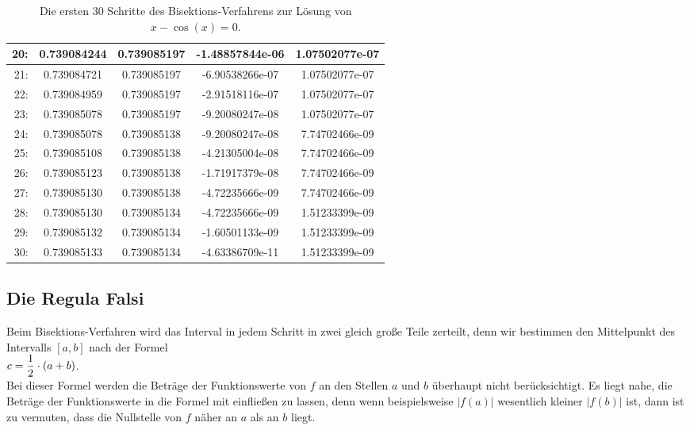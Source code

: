 \begin{table}[!h]
{\begin{tabular}{|r|c|c|c|c|}
\hline
 20: & 0.739084244 & 0.739085197 & -1.48857844e-06 & 1.07502077e-07 \\
\hline
 21: & 0.739084721 & 0.739085197 & -6.90538266e-07 & 1.07502077e-07 \\
\hline
 22: & 0.739084959 & 0.739085197 & -2.91518116e-07 & 1.07502077e-07 \\
\hline
 23: & 0.739085078 & 0.739085197 & -9.20080247e-08 & 1.07502077e-07 \\
\hline
 24: & 0.739085078 & 0.739085138 & -9.20080247e-08 & 7.74702466e-09 \\
\hline
 25: & 0.739085108 & 0.739085138 & -4.21305004e-08 & 7.74702466e-09 \\
\hline
 26: & 0.739085123 & 0.739085138 & -1.71917379e-08 & 7.74702466e-09 \\
\hline
 27: & 0.739085130 & 0.739085138 & -4.72235666e-09 & 7.74702466e-09 \\
\hline
 28: & 0.739085130 & 0.739085134 & -4.72235666e-09 & 1.51233399e-09 \\
\hline
 29: & 0.739085132 & 0.739085134 & -1.60501133e-09 & 1.51233399e-09 \\
\hline
 30: & 0.739085133 & 0.739085134 & -4.63386709e-11 & 1.51233399e-09 \\
\hline
  \end{tabular}}
  \caption{Die ersten 30 Schritte des Bisektions-Verfahrens zur L\"osung von $x - \cos(x) = 0$.}
  \label{tab:bisection}
\end{table}


\subsection{Die Regula Falsi}
Beim Bisektions-Verfahren wird das Interval in jedem Schritt in zwei gleich gro{\ss}e Teile
zerteilt, denn wir bestimmen den Mittelpunkt des Intervalls $[a, b]$ nach der Formel
\\[0.2cm]
\hspace*{1.3cm}
$\displaystyle c = \frac{1}{2} \cdot (a + b)$.
\\[0.2cm]
Bei dieser Formel werden die Betr\"age der Funktionswerte von $f$ an den Stellen $a$ und $b$ \"uberhaupt
nicht ber\"ucksichtigt.  Es liegt nahe, die Betr\"age der Funktionswerte in die Formel mit einflie{\ss}en zu
lassen, denn wenn beispielsweise $|f(a)|$ wesentlich kleiner $|f(b)|$ ist, dann ist zu
vermuten, dass die Nullstelle von $f$ n\"aher an $a$ als an $b$ liegt.

